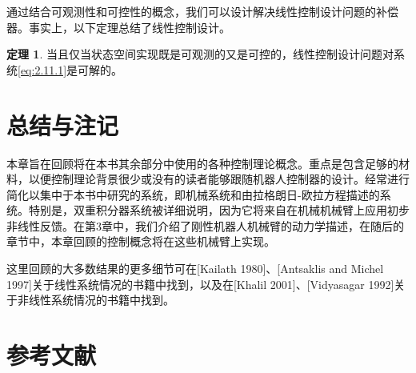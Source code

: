 \documentclass[UTF8,12pt,a4paper]{ctexart}
\theoremstyle{definition}
\newtheorem{theorem}{定理}[section]
\begin{document}
通过结合可观测性和可控性的概念，我们可以设计解决线性控制设计问题的补偿器。事实上，以下定理总结了线性控制设计。

\begin{theorem}
当且仅当状态空间实现既是可观测的又是可控的，线性控制设计问题对系统\eqref{eq:2.11.1}是可解的。
\end{theorem}

\section{总结与注记}

本章旨在回顾将在本书其余部分中使用的各种控制理论概念。重点是包含足够的材料，以便控制理论背景很少或没有的读者能够跟随机器人控制器的设计。经常进行简化以集中于本书中研究的系统，即机械系统和由拉格朗日-欧拉方程描述的系统。特别是，双重积分器系统被详细说明，因为它将来自在机械机械臂上应用初步非线性反馈。在第3章中，我们介绍了刚性机器人机械臂的动力学描述，在随后的章节中，本章回顾的控制概念将在这些机械臂上实现。

这里回顾的大多数结果的更多细节可在[Kailath 1980]、[Antsaklis and Michel 1997]关于线性系统情况的书籍中找到，以及在[Khalil 2001]、[Vidyasagar 1992]关于非线性系统情况的书籍中找到。

\section*{参考文献}
\end{document}
